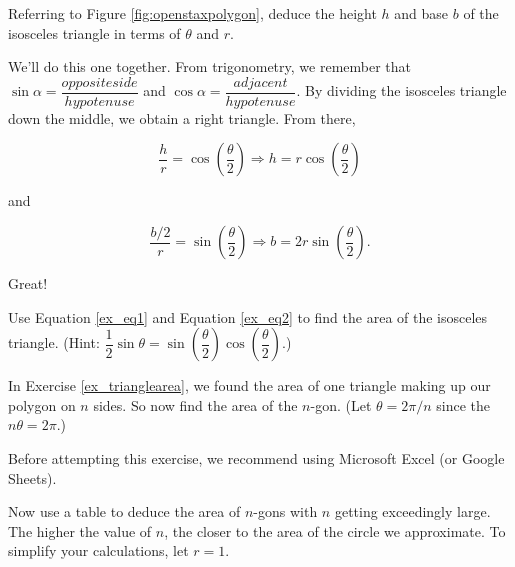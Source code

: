 \begin{exercise}
Referring to Figure \ref{fig:openstaxpolygon}, deduce the height $h$ and base $b$ of the isosceles triangle in terms of $\theta$ and $r$.
\end{exercise}

\noindent We'll do this one together. From trigonometry, we remember that $\sin{\alpha} = \dfrac{opposite side}{hypotenuse}$ and $\cos{\alpha} = \dfrac{adjacent}{hypotenuse}$. By dividing the isosceles triangle down the middle, we obtain a right triangle. From there,

\begin{equation}\label{ex_eq1}
    \dfrac{h}{r} = \cos\left(\dfrac{\theta}{2} \right) \Rightarrow h = r\cos\left(\dfrac{\theta}{2} \right) 
\end{equation}

\noindent and 

\begin{equation}\label{ex_eq2}
    \dfrac{b/2}{r} = \sin\left(\dfrac{\theta}{2} \right) \Rightarrow b = 2r\sin\left(\dfrac{\theta}{2} \right). 
\end{equation}

\noindent Great! 

\begin{exercise}\label{ex_trianglearea}
Use Equation \ref{ex_eq1} and Equation \ref{ex_eq2} to find the area of the isosceles triangle. (Hint: $\dfrac{1}{2}\sin{\theta} = \sin\left(\dfrac{\theta}{2} \right)\cos\left(\dfrac{\theta}{2} \right)$.)
\end{exercise}

\newpage

\begin{exercise}
In Exercise \ref{ex_trianglearea}, we found the area of one triangle making up our polygon on $n$ sides. So now find the area of the $n$-gon. (Let $\theta = 2\pi/n$ since the $n\theta = 2\pi$.)
\end{exercise}

\vspace{2in}


\noindent Before attempting this exercise, we recommend using Microsoft Excel (or Google Sheets). 

\begin{exercise}
Now use a table to deduce the area of $n$-gons with $n$ getting exceedingly large. The higher the value of $n$, the closer to the area of the circle we approximate. To simplify your calculations, let $r = 1$.
\end{exercise}

